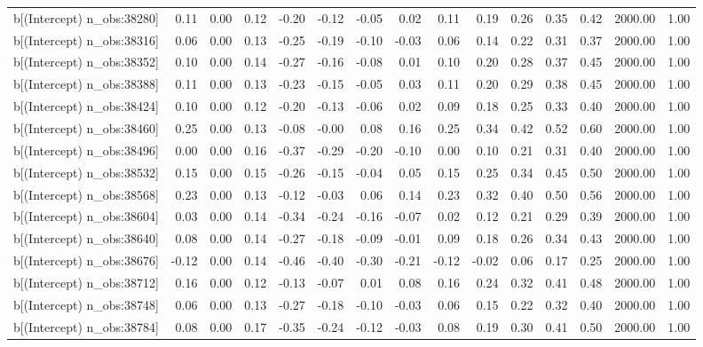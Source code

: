 \begin{table}[ht]
\begin{tabular}{rrrrrrrrrrrrrrr}
  b[(Intercept) n\_obs:38280] & 0.11 & 0.00 & 0.12 & -0.20 & -0.12 & -0.05 & 0.02 & 0.11 & 0.19 & 0.26 & 0.35 & 0.42 & 2000.00 & 1.00 \\ 
  b[(Intercept) n\_obs:38316] & 0.06 & 0.00 & 0.13 & -0.25 & -0.19 & -0.10 & -0.03 & 0.06 & 0.14 & 0.22 & 0.31 & 0.37 & 2000.00 & 1.00 \\ 
  b[(Intercept) n\_obs:38352] & 0.10 & 0.00 & 0.14 & -0.27 & -0.16 & -0.08 & 0.01 & 0.10 & 0.20 & 0.28 & 0.37 & 0.45 & 2000.00 & 1.00 \\ 
  b[(Intercept) n\_obs:38388] & 0.11 & 0.00 & 0.13 & -0.23 & -0.15 & -0.05 & 0.03 & 0.11 & 0.20 & 0.29 & 0.38 & 0.45 & 2000.00 & 1.00 \\ 
  b[(Intercept) n\_obs:38424] & 0.10 & 0.00 & 0.12 & -0.20 & -0.13 & -0.06 & 0.02 & 0.09 & 0.18 & 0.25 & 0.33 & 0.40 & 2000.00 & 1.00 \\ 
  b[(Intercept) n\_obs:38460] & 0.25 & 0.00 & 0.13 & -0.08 & -0.00 & 0.08 & 0.16 & 0.25 & 0.34 & 0.42 & 0.52 & 0.60 & 2000.00 & 1.00 \\ 
  b[(Intercept) n\_obs:38496] & 0.00 & 0.00 & 0.16 & -0.37 & -0.29 & -0.20 & -0.10 & 0.00 & 0.10 & 0.21 & 0.31 & 0.40 & 2000.00 & 1.00 \\ 
  b[(Intercept) n\_obs:38532] & 0.15 & 0.00 & 0.15 & -0.26 & -0.15 & -0.04 & 0.05 & 0.15 & 0.25 & 0.34 & 0.45 & 0.50 & 2000.00 & 1.00 \\ 
  b[(Intercept) n\_obs:38568] & 0.23 & 0.00 & 0.13 & -0.12 & -0.03 & 0.06 & 0.14 & 0.23 & 0.32 & 0.40 & 0.50 & 0.56 & 2000.00 & 1.00 \\ 
  b[(Intercept) n\_obs:38604] & 0.03 & 0.00 & 0.14 & -0.34 & -0.24 & -0.16 & -0.07 & 0.02 & 0.12 & 0.21 & 0.29 & 0.39 & 2000.00 & 1.00 \\ 
  b[(Intercept) n\_obs:38640] & 0.08 & 0.00 & 0.14 & -0.27 & -0.18 & -0.09 & -0.01 & 0.09 & 0.18 & 0.26 & 0.34 & 0.43 & 2000.00 & 1.00 \\ 
  b[(Intercept) n\_obs:38676] & -0.12 & 0.00 & 0.14 & -0.46 & -0.40 & -0.30 & -0.21 & -0.12 & -0.02 & 0.06 & 0.17 & 0.25 & 2000.00 & 1.00 \\ 
  b[(Intercept) n\_obs:38712] & 0.16 & 0.00 & 0.12 & -0.13 & -0.07 & 0.01 & 0.08 & 0.16 & 0.24 & 0.32 & 0.41 & 0.48 & 2000.00 & 1.00 \\ 
  b[(Intercept) n\_obs:38748] & 0.06 & 0.00 & 0.13 & -0.27 & -0.18 & -0.10 & -0.03 & 0.06 & 0.15 & 0.22 & 0.32 & 0.40 & 2000.00 & 1.00 \\ 
  b[(Intercept) n\_obs:38784] & 0.08 & 0.00 & 0.17 & -0.35 & -0.24 & -0.12 & -0.03 & 0.08 & 0.19 & 0.30 & 0.41 & 0.50 & 2000.00 & 1.00 \\ 

\end{tabular}
\end{table}
